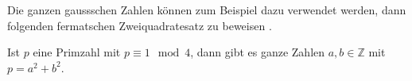 Die ganzen gaussschen Zahlen können zum Beispiel dazu verwendet
werden, dann folgenden fermatschen Zweiquadratesatz zu beweisen
\cite[Satz 10.4]{buch:luneburg}.

\begin{satz}[Fermat]
%
%
Ist $p$ eine Primzahl mit $p\equiv 1\mod 4$, dann gibt es ganze
Zahlen $a,b\in\mathbb{Z}$ mit $p=a^2+b^2$.
\end{satz}



